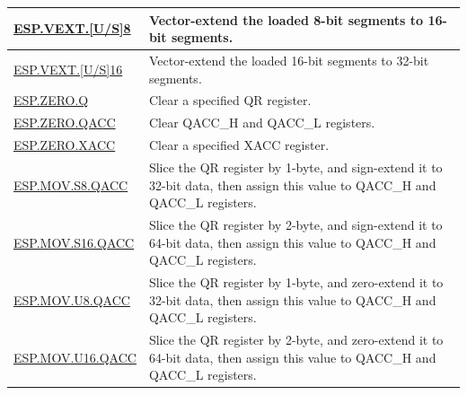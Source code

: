 \begin{longtable}[c]{|l|m{11cm}|}
    \\\hline
    \hyperref[instruction:ESPVEXTS8]{ESP.VEXT.[U/S]8} & Vector-extend the loaded 8-bit segments to 16-bit segments.
    \\\hline
    \hyperref[instruction:ESPVEXTS16]{ESP.VEXT.[U/S]16} & Vector-extend the loaded 16-bit segments to 32-bit segments.
    \\\hline
    \hyperref[instruction:ESPZEROQ]{ESP.ZERO.Q} & Clear a specified QR register.
    \\\hline
    \hyperref[instruction:ESPZEROQACC]{ESP.ZERO.QACC} & Clear QACC\_H and QACC\_L registers.
    \\\hline
    \hyperref[instruction:ESPZEROXACC]{ESP.ZERO.XACC} & Clear a specified XACC register.
    \\\hline
    \hyperref[instruction:ESPMOVS8QACC]{ESP.MOV.S8.QACC} & Slice the QR register by 1-byte, and sign-extend it to 32-bit data, then assign this value to QACC\_H and QACC\_L registers.
    \\\hline
    \hyperref[instruction:ESPMOVS16QACC]{ESP.MOV.S16.QACC} & Slice the QR register by 2-byte, and sign-extend it to 64-bit data, then assign this value to QACC\_H and QACC\_L registers.
    \\\hline
    \hyperref[instruction:ESPMOVU8QACC]{ESP.MOV.U8.QACC} & Slice the QR register by 1-byte, and zero-extend it to 32-bit data, then assign this value to QACC\_H and QACC\_L registers.
    \\\hline
    \hyperref[instruction:ESPMOVU16QACC]{ESP.MOV.U16.QACC} & Slice the QR register by 2-byte, and zero-extend it to 64-bit data, then assign this value to QACC\_H and QACC\_L registers.
    \\\hline
\end{longtable}
